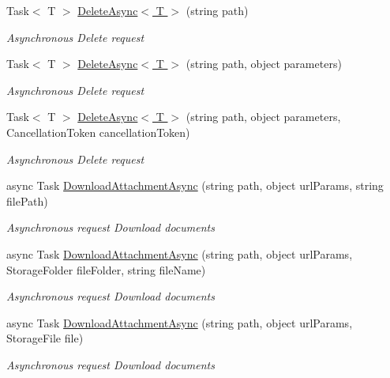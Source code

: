 \begin{DoxyCompactItemize}
Task$<$ T $>$ \hyperlink{class_accela_1_1_windows_store_s_d_k_1_1_accela_s_d_k_a168bc682b6c33043b51f10e652ef78d9}{Delete\+Async$<$ T $>$} (string path)
\begin{DoxyCompactList}\small\item\em Asynchronous Delete request \end{DoxyCompactList}\item 
Task$<$ T $>$ \hyperlink{class_accela_1_1_windows_store_s_d_k_1_1_accela_s_d_k_aef49e735651aea50041566d2b8af37c1}{Delete\+Async$<$ T $>$} (string path, object parameters)
\begin{DoxyCompactList}\small\item\em Asynchronous Delete request \end{DoxyCompactList}\item 
Task$<$ T $>$ \hyperlink{class_accela_1_1_windows_store_s_d_k_1_1_accela_s_d_k_ab08e47944a9bc82841e529d7528088dc}{Delete\+Async$<$ T $>$} (string path, object parameters, Cancellation\+Token cancellation\+Token)
\begin{DoxyCompactList}\small\item\em Asynchronous Delete request \end{DoxyCompactList}\item 
async Task \hyperlink{class_accela_1_1_windows_store_s_d_k_1_1_accela_s_d_k_a5482d2b82d65b574e14cb3d5a8a5e3c0}{Download\+Attachment\+Async} (string path, object url\+Params, string file\+Path)
\begin{DoxyCompactList}\small\item\em Asynchronous request Download documents \end{DoxyCompactList}\item 
async Task \hyperlink{class_accela_1_1_windows_store_s_d_k_1_1_accela_s_d_k_a178b95916771905fca981cef2a6732fd}{Download\+Attachment\+Async} (string path, object url\+Params, Storage\+Folder file\+Folder, string file\+Name)
\begin{DoxyCompactList}\small\item\em Asynchronous request Download documents \end{DoxyCompactList}\item 
async Task \hyperlink{class_accela_1_1_windows_store_s_d_k_1_1_accela_s_d_k_a608a2caabfe60cdaeadcca6aeac82db3}{Download\+Attachment\+Async} (string path, object url\+Params, Storage\+File file)
\begin{DoxyCompactList}\small\item\em Asynchronous request Download documents \end{DoxyCompactList}\item 

\end{DoxyCompactItemize}
